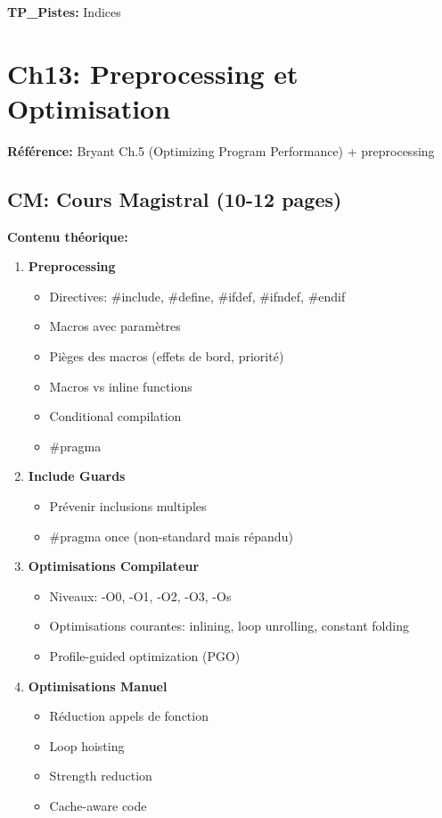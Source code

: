 \documentclass[10pt,a4paper]{article}
\begin{document}
\textbf{TP\_Pistes:} Indices

\newpage

\section{Ch13: Preprocessing et Optimisation}

\textbf{Référence:} Bryant Ch.5 (Optimizing Program Performance) + preprocessing

\subsection*{CM: Cours Magistral (10-12 pages)}

\textbf{Contenu théorique:}
\begin{enumerate}
\item \textbf{Preprocessing}
   \begin{itemize}
   \item Directives: \#include, \#define, \#ifdef, \#ifndef, \#endif
   \item Macros avec paramètres
   \item Pièges des macros (effets de bord, priorité)
   \item Macros vs inline functions
   \item Conditional compilation
   \item \#pragma
   \end{itemize}

\item \textbf{Include Guards}
   \begin{itemize}
   \item Prévenir inclusions multiples
   \item \#pragma once (non-standard mais répandu)
   \end{itemize}

\item \textbf{Optimisations Compilateur}
   \begin{itemize}
   \item Niveaux: -O0, -O1, -O2, -O3, -Os
   \item Optimisations courantes: inlining, loop unrolling, constant folding
   \item Profile-guided optimization (PGO)
   \end{itemize}

\item \textbf{Optimisations Manuel}
   \begin{itemize}
   \item Réduction appels de fonction
   \item Loop hoisting
   \item Strength reduction
   \item Cache-aware code
   \end{itemize}


\end{enumerate}
\end{document}
